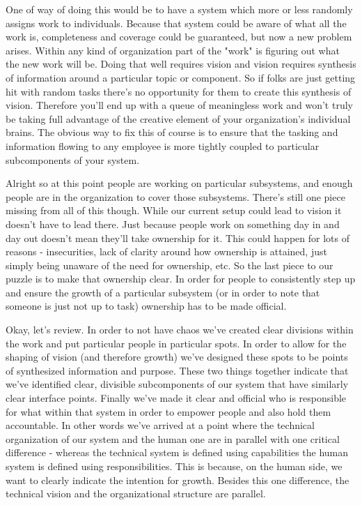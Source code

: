 \documentclass[10pt,a5paper]{book}
\begin{document}
One of way of doing this would be to have a system which more or less randomly assigns work to individuals. Because that system could be aware of what all the work is, completeness and coverage could be guaranteed, but now a new problem arises. Within any kind of organization part of the "work" is figuring out what the new work will be. Doing that well requires vision and vision requires synthesis of information around a particular topic or component. So if folks are just getting hit with random tasks there's no opportunity for them to create this synthesis of vision. Therefore you'll end up with a queue of meaningless work and won't truly be taking full advantage of the creative element of your organization's individual brains. The obvious way to fix this of course is to ensure that the tasking and information flowing to any employee is more tightly coupled to particular subcomponents of your system. 

Alright so at this point people are working on particular subsystems, and enough people are in the organization to cover those subsystems. There's still one piece missing from all of this though. While our current setup could lead to vision it doesn't have to lead there. Just because people work on something day in and day out doesn't mean they'll take ownership for it. This could happen for lots of reasons - insecurities, lack of clarity around how ownership is attained, just simply being unaware of the need for ownership, etc. So the last piece to our puzzle is to make that ownership clear. In order for people to consistently step up and ensure the growth of a particular subsystem (or in order to note that someone is just not up to task) ownership has to be made official.

Okay, let's review. In order to not have chaos we've created clear divisions within the work and put particular people in particular spots. In order to allow for the shaping of vision (and therefore growth) we've designed these spots to be points of synthesized information and purpose. These two things together indicate that we've identified clear, divisible subcomponents of our system that have similarly clear interface points. Finally we've made it clear and official who is responsible for what within that system in order to empower people and also hold them accountable. In other words we've arrived at a point where the technical organization of our system and the human one are in parallel with one critical difference - whereas the technical system is defined using capabilities the human system is defined using responsibilities. This is because, on the human side, we want to clearly indicate the intention for growth. Besides this one difference, the technical vision and the organizational structure are parallel. 
\end{document}
